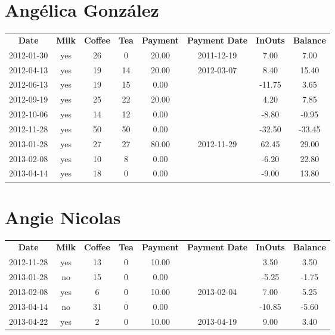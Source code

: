 \section{Ang\'elica Gonz\'alez}

\begin{center}
\begin{tabular}{cccccccc}
\textbf{Date} & \textbf{Milk} & \textbf{Coffee} & \textbf{Tea} & \textbf{Payment} & \textbf{Payment Date} & \textbf{InOuts} & \textbf{Balance} \\
2012-01-30 & yes & 26 &  0 & 20.00 & 2011-12-19 &   7.00 &   7.00\\ 
2012-04-13 & yes & 19 & 14 & 20.00 & 2012-03-07 &   8.40 &  15.40\\ 
2012-06-13 & yes & 19 & 15 &  0.00 &  & -11.75 &   3.65\\ 
2012-09-19 & yes & 25 & 22 & 20.00 &  &   4.20 &   7.85\\ 
2012-10-06 & yes & 14 & 12 &  0.00 &  &  -8.80 &  -0.95\\ 
2012-11-28 & yes & 50 & 50 &  0.00 &  & -32.50 & -33.45\\ 
2013-01-28 & yes & 27 & 27 & 80.00 & 2012-11-29 &  62.45 &  29.00\\ 
2013-02-08 & yes & 10 &  8 &  0.00 &  &  -6.20 &  22.80\\ 
2013-04-14 & yes & 18 &  0 &  0.00 &  &  -9.00 &  13.80
\end{tabular}
\end{center}

\section{Angie Nicolas}

\begin{center}
\begin{tabular}{cccccccc}
\textbf{Date} & \textbf{Milk} & \textbf{Coffee} & \textbf{Tea} & \textbf{Payment} & \textbf{Payment Date} & \textbf{InOuts} & \textbf{Balance} \\
2012-11-28 & yes & 13 & 0 & 10.00 &  &   3.50 &  3.50\\ 
2013-01-28 & no & 15 & 0 &  0.00 &  &  -5.25 & -1.75\\ 
2013-02-08 & yes &  6 & 0 & 10.00 & 2013-02-04 &   7.00 &  5.25\\ 
2013-04-14 & no & 31 & 0 &  0.00 &  & -10.85 & -5.60\\ 
2013-04-22 & yes &  2 & 0 & 10.00 & 2013-04-19 &   9.00 &  3.40
\end{tabular}
\end{center}


